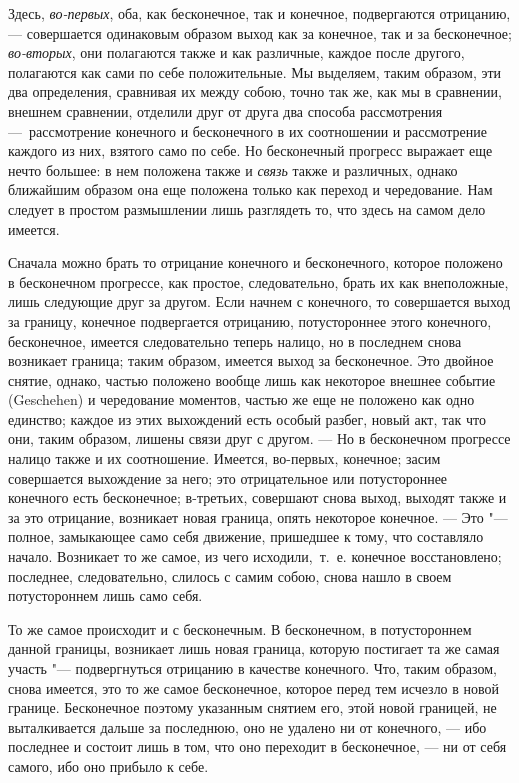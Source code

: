 Здесь, {\em во-первых}, оба, как бесконечное, так и
конечное, подвергаются отрицанию, — совершается одинаковым образом выход
как за конечное, так и за бесконечное; {\em во-вторых},
они полагаются также и как различные, каждое после другого, полагаются как
сами по себе положительные. Мы выделяем, таким образом, эти два
определения, сравнивая их между собою, точно так же, как мы в сравнении,
внешнем сравнении, отделили друг от друга два способа рассмотрения
—~рассмотрение конечного и бесконечного в их соотношении и рассмотрение
каждого из них, взятого само по себе. Но бесконечный прогресс выражает еще
нечто большее: в нем положена также и {\em связь} также
и различных, однако ближайшим образом она еще положена только как переход и
чередование. Нам следует в простом размышлении лишь разглядеть то, что
здесь на самом дело имеется.

Сначала можно брать то отрицание конечного и бесконечного, которое положено
в бесконечном прогрессе, как простое, следовательно, брать их как
внеположные, лишь следующие друг за другом. Если начнем с конечного, то
совершается выход за границу, конечное подвергается отрицанию,
потустороннее этого конечного, бесконечное, имеется следовательно теперь
налицо, но в последнем снова возникает граница; таким образом, имеется
выход за бесконечное. Это двойное снятие, однако, частью положено вообще
лишь как некоторое внешнее событие (Geschehen) и чередование моментов,
частью же еще не положено как одно единство; каждое из этих выхождений есть
особый разбег, новый акт, так что они, таким образом, лишены связи друг с
другом. — Но в бесконечном прогрессе налицо также и их соотношение.
Имеется, во-первых, конечное; засим совершается выхождение за него; это
отрицательное или потустороннее конечного есть бесконечное; в-третьих,
совершают снова выход, выходят также и за это отрицание, возникает новая
граница, опять некоторое конечное. — Это "--- полное, замыкающее само себя
движение, пришедшее к тому, что составляло начало. Возникает то же самое,
из чего исходили,~т.~е. конечное восстановлено; последнее, следовательно,
слилось с самим собою, снова нашло в своем потустороннем лишь само себя.

То же самое происходит и с бесконечным. В бесконечном, в потустороннем
данной границы, возникает лишь новая граница, которую постигает та же самая
участь "--- подвергнуться отрицанию в качестве конечного. Что, таким образом,
снова имеется, это то же самое бесконечное, которое перед тем исчезло в
новой границе. Бесконечное поэтому указанным снятием его, этой новой
границей, не выталкивается дальше за последнюю, оно не удалено ни от
конечного, — ибо последнее и состоит лишь в том, что оно переходит в
бесконечное, — ни от себя самого, ибо оно прибыло к себе.

